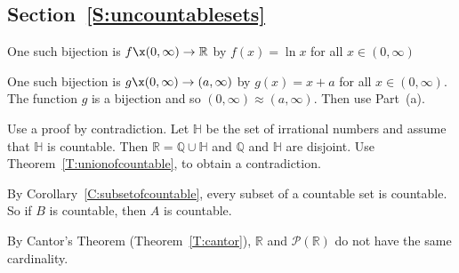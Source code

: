 \subsection*{Section~\ref{S:uncountablesets}}

\begin{list}{\bf{\ref{exer:sec94-1}.}}
\item \begin{list}{\bf{(a)}}
\item One such bijection is $f\x ( 0, \infty ) \to \mathbb{R}$ by $f ( x ) = \ln x$ for all 
$x \in ( 0, \infty )$
\end{list}
\end{list}

\begin{list}{}
\item \begin{list}{\bf{(b)}}
\item One such bijection is $g\x ( 0, \infty ) \to ( a, \infty )$ by $g( x ) = x + a$ for all $x \in ( 0, \infty )$.  The function $g$ is a bijection and so 
$\left( 0, \infty \right) \approx \left( a, \infty \right)$.  Then use Part~(a).
\end{list}
\end{list}


\begin{list}{\bf{\ref{exer:irrationaluncount}.}}
\item Use a proof by contradiction.  Let $\mathbb{H}$ be the set of irrational numbers and assume that $\mathbb{H}$ is countable.  Then 
$\mathbb{R} = \mathbb{Q} \cup \mathbb{H}$ and $\mathbb{Q}$ and $\mathbb{H}$ are disjoint.  Use Theorem~\ref{T:unionofcountable}, to obtain a contradiction.
\end{list}


\begin{list}{\bf{\ref{exer:supersetofuncount}.}}
\item By Corollary~\ref{C:subsetofcountable}, every subset of a countable set is countable.  So if 
$B$ is countable, then $A$ is countable. %
\end{list}


\begin{list}{\bf{\ref{exer93:uncountablesets}.}}
\item By Cantor's Theorem (Theorem~\ref{T:cantor}), $\mathbb{R}$ and 
$\mathcal{P} \left( \mathbb{R} \right)$ do not have the same cardinality.
\end{list}

\hbreak
\endinput
